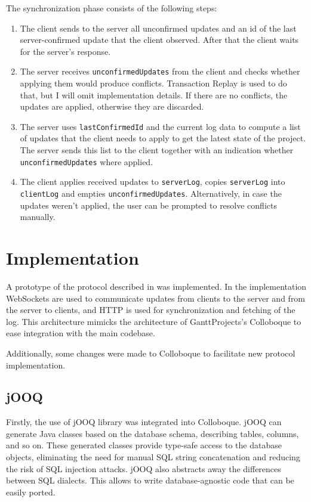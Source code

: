 \documentclass[a4paper, 11pt, oneside]{article}
\theoremstyle{definition}
\begin{document}
The synchronization phase consists of the following steps:

\begin{enumerate}
    \item The client sends to the server all unconfirmed updates and an id of the last server-confirmed update that the client observed. After that the client waits for the server's response.
    \item The server receives \verb|unconfirmedUpdates| from the client and checks whether applying them would produce conflicts. Transaction Replay is used to do that, but I will omit implementation details. If there are no conflicts, the updates are applied, otherwise they are discarded.
    \item The server uses \verb|lastConfirmedId| and the current log data to compute a list of updates that the client needs to apply to get the latest state of the project. The server sends this list to the client together with an indication whether \verb|unconfirmedUpdates| where applied.
    \item The client applies received updates to \verb|serverLog|, copies \verb|serverLog| into \verb|clientLog| and empties \verb|unconfirmedUpdates|. Alternatively, in case the updates weren't applied, the user can be prompted to resolve conflicts manually.
\end{enumerate}

\section{Implementation}

A prototype of the protocol described in  was implemented\cite{prototype}. In the implementation WebSockets are used to communicate updates from clients to the server and from the server to clients, and HTTP is used for synchronization and fetching of the log. This architecture mimicks the architecture of GanttProjects's Colloboque to ease integration with the main codebase.

Additionally, some changes were made to Colloboque to facilitate new protocol implementation.

\subsection*{jOOQ}

Firstly, the use of jOOQ library \cite{jooq} was integrated into Colloboque. jOOQ can generate Java classes based on the database schema, describing tables, columns, and so on. These generated classes provide type-safe access to the database objects, eliminating the need for manual SQL string concatenation and reducing the risk of SQL injection attacks. jOOQ also abstracts away the differences between SQL dialects. This allows to write database-agnostic code that can be easily ported.
\end{document}
